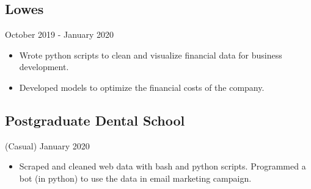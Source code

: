 \documentclass{article}
\begin{document}
\subsection*{Lowes}
\textcolor{light-gray}{October 2019 - January 2020}
\begin{itemize}
	\item Wrote python scripts to clean and visualize financial data for business development.
  \item Developed models to optimize the financial costs of the company.
\end{itemize}
\subsection*{Postgraduate Dental School}
\textcolor{light-gray}{(Casual) January 2020}
\begin{itemize}
  \item Scraped and cleaned web data with bash and python scripts. Programmed a bot (in python) to use the data in email marketing campaign.
\end{itemize}
\end{document}
